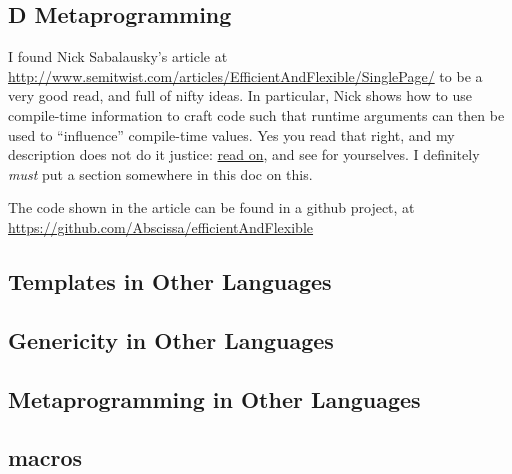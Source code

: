 \subsection{D Metaprogramming}
\label{dmetaprogramming}

I found Nick Sabalausky's article at \url{http://www.semitwist.com/articles/EfficientAndFlexible/SinglePage/} to be a very good read, and full of nifty ideas. In particular, Nick shows how to use compile-time information to craft code such that runtime arguments can then be used to ``influence'' compile-time values. Yes you read that right, and my description does not do it justice: \href{http://www.semitwist.com/articles/EfficientAndFlexible/SinglePage/#part6-3}{read on}, and see for yourselves. I definitely \emph{must} put a section somewhere in this doc on this.

The code shown in the article can be found in a github project, at \url{https://github.com/Abscissa/efficientAndFlexible}

\subsection{Templates in Other Languages}
\label{templatesinotherlanguages}


\subsection{Genericity in Other Languages}
\label{genericity}


\subsection{Metaprogramming in Other Languages}
\subsection{macros}



